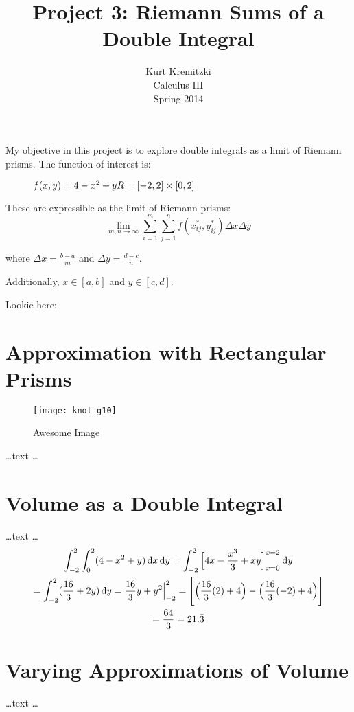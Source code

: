 \documentclass{article}
\begin{document}
\title{Project 3: Riemann Sums of a Double Integral}
\author{Kurt Kremitzki\\
        Calculus III\\
        Spring 2014}
\maketitle

My objective in this project is to explore double integrals as a limit of Riemann prisms. The function of interest is:

\begin{figure}[h]
$f(x,y) = 4 - x^2 + y
\hfill R = [-2,2] \times [0,2]$
\end{figure}

These are expressible as the limit of Riemann prisms:
\begin{equation}
    \lim_{m,n \to \infty} \sum_{i=1}^{m} \sum_{j=1}^{n} f(x_{ij}^{ *}, y_{ij}^{ *}) \Delta x \Delta y
\end{equation}

where $\Delta x = \frac{b-a}{m}$ and $\Delta y = \frac{d - c}{n}$.

Additionally, $x \in [a, b]$ and $y \in [c, d]$.

Lookie here:

\section{Approximation with Rectangular Prisms}
\begin{SCfigure}
    \centering
    \texttt{[image: knot\_g10]}
    \caption{Awesome Image}
\end{SCfigure}

    \ldots text \ldots

\section{Volume as a Double Integral}
    \ldots text \ldots
\begin{gather}
    \notag{\int_{-2}^2 \int_0^2 (4 - x^2 + y) \, \mathrm{d}x \, \mathrm{d}y = \int_{-2}^2 \Big[ 4x - \frac{x^3}{3} + xy \Big]_{x = 0}^{x = 2} \: \mathrm{d}y} \\
    \notag{= \int_{-2}^2 (\frac{16}{3} + 2y) \, \mathrm{d}y = \frac{16}{3}y + y^2 \Big|_{-2}^{2} = \Bigg[\Big(\frac{16}{3}(2) + 4\Big) - \Big(\frac{16}{3}(-2) + 4\Big)\Bigg]} \\
    \notag{= \frac{64}{3} = 21.\bar{3}}
\end{gather}

\section{Varying Approximations of Volume}
    \ldots text \ldots
\end{document}
